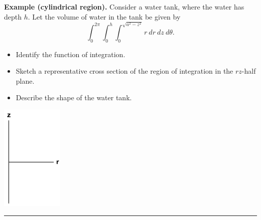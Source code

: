 \documentclass[12pt,letterpaper,noanswers]{exam}
\begin{document}
\noindent\textbf{Example (cylindrical region).}  Consider a water tank, where the water has depth $h$.  Let the volume of water in the tank be given by \[\int_0^{2\pi}\int_0^h\int_0^{\sqrt{a^2-z^2}} r\ dr\ dz\ d\theta.\]
\begin{itemize}
    \item Identify the function of integration.
    \item Sketch a representative cross section of the region of integration in the $rz$-half plane.
    \item Describe the shape of the water tank.
\end{itemize} 

\includegraphics[height=2in]{img/C13rzaxes.png}






\vspace{0.2cm}
\hrule
\vspace{0.2cm}

\eject
\end{document}
